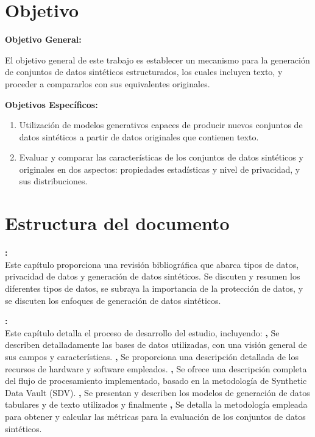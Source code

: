 \section{Objetivo}

\textbf{Objetivo General:}

El objetivo general de este trabajo es establecer un mecanismo para la generación de conjuntos de datos sintéticos estructurados, los cuales incluyen texto, y proceder a compararlos con sus equivalentes originales.

\textbf{Objetivos Específicos:}
\begin{enumerate}
    \item Utilización de modelos generativos capaces de producir nuevos conjuntos de datos sintéticos a partir de datos originales que contienen texto.
    \item Evaluar y comparar las características de los conjuntos de datos sintéticos y originales en dos aspectos: propiedades estadísticas y nivel de privacidad, y sus distribuciones.
\end{enumerate}

\section{Estructura del documento}

\textbf{:}  \\
Este capítulo proporciona una revisión bibliográfica que abarca tipos de datos, privacidad de datos y generación de datos sintéticos. Se discuten y resumen los diferentes tipos de datos, se subraya la importancia de la protección de datos, y se discuten los enfoques de generación de datos sintéticos.

\textbf{:}  \\
Este capítulo detalla el proceso de desarrollo del estudio, incluyendo: 
\textbf{,} Se describen detalladamente las bases de datos utilizadas, con una visión general de sus campos y características. 
\textbf{,} Se proporciona una descripción detallada de los recursos de hardware y software empleados. 
\textbf{,} Se ofrece una descripción completa del flujo de procesamiento implementado, basado en la metodología de Synthetic Data Vault (SDV). 
\textbf{,} Se presentan y describen los modelos de generación de datos tabulares y de texto utilizados y finalmente
\textbf{,} Se detalla la metodología empleada para obtener y calcular las métricas para la evaluación de los conjuntos de datos sintéticos.

